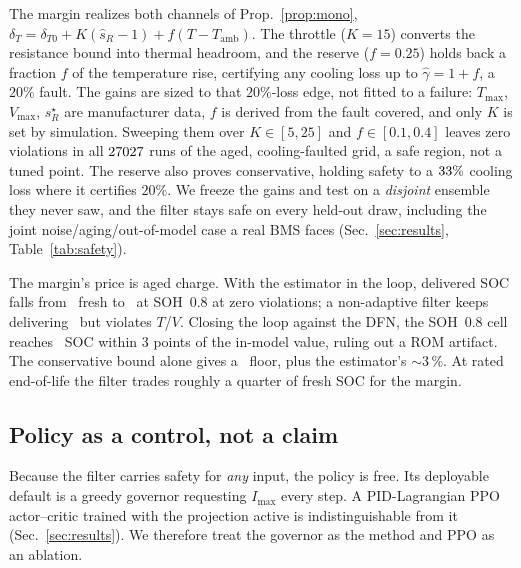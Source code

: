 \documentclass[conference]{IEEEtran}
\newcommand{\SI}[2]{#1\,#2}
\begin{document}
The margin realizes both channels of Prop.~\ref{prop:mono},
$\delta_T{=}\delta_{T0}{+}K(\hat s_R{-}1){+}f(T{-}T_\mathrm{amb})$. The throttle ($K{=}15$) converts
the resistance bound into thermal headroom, and the reserve ($f{=}0.25$) holds back a fraction $f$ of
the temperature rise, certifying any cooling loss up to $\hat\gamma{=}1{+}f$, a $20\%$ fault. The
gains are sized to that $20\%$-loss edge, not fitted to a failure: $T_{\max}$, $V_{\max}$, $s_R^\star$ are
manufacturer data, $f$ is derived from the fault covered, and only $K$ is set by simulation. Sweeping them over $K\in[5,25]$ and
$f\in[0.1,0.4]$ leaves zero violations in all $27027$ runs of the aged, cooling-faulted grid, a safe region, not a tuned point. The reserve also proves conservative, holding safety to a $33\%$
cooling loss where it certifies $20\%$. We freeze the gains and test on a \emph{disjoint} ensemble they never saw, and the filter stays safe on
every held-out draw, including the joint noise/aging/out-of-model case a real BMS faces
(Sec.~\ref{sec:results}, Table~\ref{tab:safety}).

The margin's price is aged charge. With the estimator in the loop, delivered SOC falls from
\estSocFresh\ fresh to \estSocAged\ at SOH~0.8 at zero violations; a non-adaptive filter keeps
delivering \estNomSocAged\ but violates $T$/$V$. Closing the loop against the DFN, the SOH~0.8 cell
reaches \clSocAged\ SOC within $3$ points of the in-model value, ruling out a ROM artifact. The conservative bound alone gives a \clOracleSocAged\ floor, plus the estimator's $\sim$\SI{3}{\%}. At
rated end-of-life the filter trades roughly a quarter of fresh SOC for the margin.

\subsection{Policy as a control, not a claim}
Because the filter carries safety for \emph{any} input, the policy is free. Its deployable default is a
greedy governor requesting $I_{\max}$ every step. A PID-Lagrangian PPO actor--critic
\cite{schulman2017ppo,stooke2020pid} trained with the projection active is indistinguishable from it
(Sec.~\ref{sec:results}). We therefore treat the governor as the method and PPO as an ablation.
\end{document}
